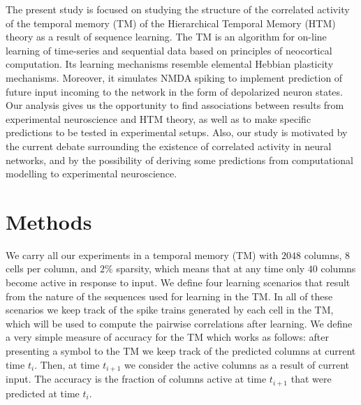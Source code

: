 \documentclass[11pt,letterpaper]{article}
\begin{document}
        The present study is focused on studying the structure of the correlated
        activity of the temporal memory (TM) of the Hierarchical Temporal Memory (HTM) theory
        as a result of sequence learning.
        The TM is an algorithm for on-line learning of time-series and sequential data based
        on principles of neocortical computation.
        Its learning mechanisms resemble elemental Hebbian plasticity mechanisms.
        Moreover, it simulates NMDA spiking to implement prediction of future input incoming to the
        network in the form of depolarized neuron states.
        Our analysis    gives us the opportunity to find associations between results from
        experimental neuroscience and HTM theory, as well as to make specific predictions
        to be tested in experimental setups.
        Also, our study is motivated by the current debate surrounding the existence of
        correlated activity in neural networks, and by the possibility of deriving some
        predictions from computational modelling to experimental neuroscience.
        
    \section{Methods}
        We carry all our experiments in a temporal memory (TM) with $2048$ columns, $8$ cells per
        column, and $2\%$ sparsity,
        which means that at any time only $40$ columns become active in response to input.
        We define four learning scenarios that result from the nature of the sequences used
        for learning in the TM.
        In all of these scenarios we keep track of the spike trains generated by each cell in the TM,
        which will be used to compute the pairwise correlations after learning.
        We define a very simple measure of accuracy for the TM which works as follows:
        after presenting a symbol to the TM we keep track of the predicted columns at
        current time $t_{i}$.
        Then, at time $t_{i+1}$ we consider the active columns as a result of current input.
        The accuracy is the fraction of columns active at time $t_{i+1}$ that were predicted
        at time $t_{i}$.        
\end{document}
